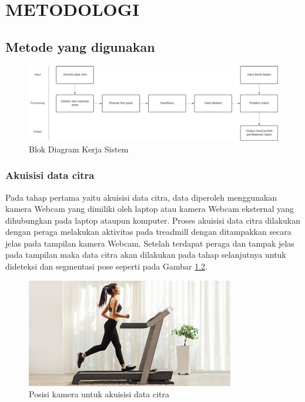 \chapter{METODOLOGI}


\section{Metode yang digunakan}

\begin{figure} [ht] \centering
  \includegraphics[scale=0.9]{gambar/blok diagram metodologi.jpeg}
  \caption{Blok Diagram Kerja Sistem}
  \label{fig:BlokDiagram}
\end{figure}

  \subsection{Akuisisi data citra}

  Pada tahap pertama yaitu akuisisi data citra, data diperoleh menggunakan kamera Webcam yang dimiliki oleh laptop atau kamera Webcam eksternal yang dihubungkan pada laptop ataupun komputer. Proses akuisisi data citra dilakukan dengan peraga melakukan aktivitas pada treadmill dengan ditampakkan secara jelas pada tampilan kamera Webcam. Setelah terdapat peraga dan tampak jelas pada tampilan maka data citra akan dilakukan pada tahap selanjutnya untuk dideteksi dan segmentasi pose seperti pada Gambar \ref{fig:AkuisisiData}.

  \begin{figure} [ht] \centering
    \includegraphics[scale=1.2]{gambar/akuisisi data.jpg}
    \caption{Posisi kamera untuk akuisisi data citra}
    \label{fig:AkuisisiData}
  \end{figure}
  
